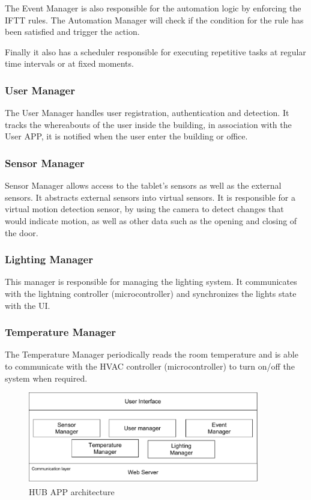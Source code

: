 The Event Manager is also responsible for the automation logic by enforcing the \ac{IFTT} rules. The Automation Manager will check if the condition for the rule has been satisfied and trigger the action. 

Finally it also has a scheduler responsible for executing repetitive tasks at regular time intervals or at fixed moments.


\subsubsection{User Manager}
The User Manager handles user registration, authentication and detection. It tracks the whereabouts of the user inside the building, in association with the User APP, it is notified when the user enter the building or office.


\subsubsection{Sensor Manager}
Sensor Manager allows access to the tablet's sensors as well as the external sensors. It abstracts external sensors into virtual sensors. It is responsible for a virtual motion detection sensor, by using the camera to detect changes that would indicate motion, as well as other data such as the opening and closing of the door.


\subsubsection{Lighting Manager}

This manager is responsible for managing the lighting system. It communicates with the lightning controller (microcontroller) and synchronizes the lights state with the \ac{UI}.

\subsubsection{Temperature Manager}

The Temperature Manager periodically reads the room temperature and is able to communicate with the \ac{HVAC} controller (microcontroller) to turn on/off the system when required.


\begin{figure}[h]
\centering
\includegraphics[width=0.9\textwidth]{Figures/software_hub}
\caption{HUB APP architecture }
\label{software2}
\end{figure}



